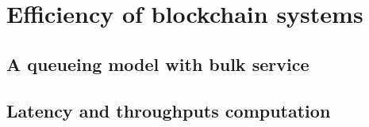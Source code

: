 \chapter{Efficiency of blockchain systems}\label{chap:efficiency}
\section{A queueing model with bulk service}\label{sec:queue}
\section{Latency and throughputs computation}\label{sec:latency_throughputs}
\newpage